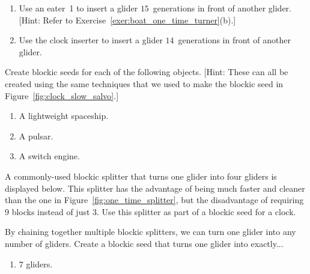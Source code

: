 \begin{multicols}{2}
\begin{problem}
\begin{enumerate}[label=(\alph*)]
		\item Use an eater~1 to insert a glider $15$~generations in front of another glider. [Hint: Refer to Exercise~\ref{exer:boat_one_time_turner}(b).]
		
		\item Use the clock inserter to insert a glider $14$~generations in front of another glider.
	\end{enumerate}
\end{problem}

\mfilbreak

\begin{problem}\label{exer:other_blockic}
	Create blockic seeds for each of the following objects. [Hint: These can all be created using the same techniques that we used to make the blockic seed in Figure~\ref{fig:clock_slow_salvo}.]
	\begin{enumerate}[label=(\alph*)]
		\item A lightweight spaceship.
		
		\item A pulsar.
		
		\item A switch engine.
	\end{enumerate}
\end{problem}

\mfilbreak

\begin{problem}\label{exer:new_splitter}
	A commonly-used blockic splitter that turns one glider into four gliders is displayed below. This splitter has the advantage of being much faster and cleaner than the one in Figure~\ref{fig:one_time_splitter}, but the disadvantage of requiring 9 blocks instead of just 3. Use this splitter as part of a blockic seed for a clock.
	\begin{center}
	\end{center}
\end{problem}

\mfilbreak

\begin{problem}\label{exer:blockic_splitter_chain}
	By chaining together multiple blockic splitters, we can turn one glider into any number of gliders. Create a blockic seed that turns one glider into exactly...
	\begin{enumerate}[label=(\alph*)]
		\item $7$ gliders.
		

\end{enumerate}
\end{problem}
\end{multicols}
